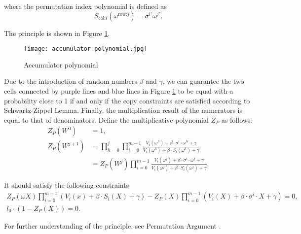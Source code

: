 where the permutation index polynomial is defined as
\[ S_{\text{col:}i}\left(\omega^{\text{row:}j}\right)=\sigma^{i'} \omega^{j'}. \]

The principle is shown in Figure \ref{fig:accumulator-polynomial}.

\begin{figure}[!ht]
    \centering
    \texttt{[image: accumulator-polynomial.jpg]}
    \caption{Accumulator polynomial}
    \label{fig:accumulator-polynomial}
\end{figure}

Due to the introduction of random numbers $\beta$ and $\gamma$, we can guarantee the two cells connected by purple lines and blue lines in Figure \ref{fig:accumulator-polynomial} to be equal with a probability close to 1 if and only if the copy constraints are satisfied according to Schwartz-Zippel Lemma. Finally, the multiplication result of the numerators is equal to that of denominators. Define the multiplicative polynomial $Z_P$ as follows:
\begin{align*}
    Z_P(W^0) &= 1, \\
    Z_P(W^{j+1}) &= \prod_{h=0}^j \prod_{i=0}^{m-1}\frac{V_i(\omega^h)+\beta \cdot \sigma^i \cdot \omega^h+\gamma}{V_i(\omega^h)+\beta \cdot S_i(\omega^h)+\gamma} \\
    &= Z_P(W^j)\prod_{i=0}^{m-1}\frac{V_i(\omega^{j})+\beta \cdot \sigma^{i} \cdot \omega^j+\gamma}{V_i(\omega^j)+\beta \cdot S_i(\omega^j)+\gamma}.
\end{align*}

It should satisfy the following constraints
\begin{align*}
    Z_P(\omega X) \prod_{i=0}^{m-1}\left(V_i(x)+\beta \cdot S_i(X)+\gamma\right) - Z_P(X) \prod_{i=0}^{m-1}\left(V_i(X)+\beta \cdot \sigma^{i} \cdot X+\gamma\right)=0, \\
    l_0 \cdot\left(1-Z_P(X)\right)=0.
\end{align*}

For further understanding of the principle, see Permutation Argument \cite{website:permutation-argument}.
